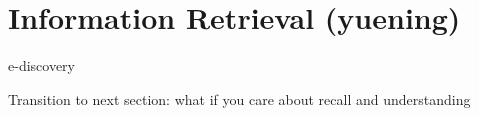 
\chapter{Information Retrieval (yuening)}
\label{ch:ir}

e-discovery

Transition to next section: what if you care about recall and understanding
